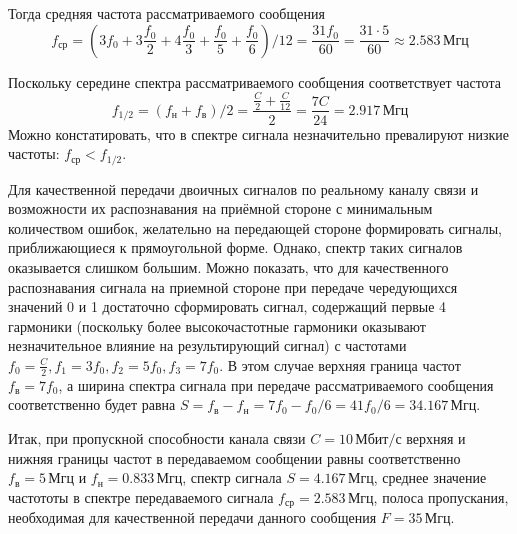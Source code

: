 Тогда средняя частота рассматриваемого сообщения
\[
	f_{\text{ср}} = \left(3f_0+3\frac{f_0}{2}+4\frac{f_0}{3}+\frac{f_0}{5}+\frac{f_0}{6}\right)/ 12 = \frac{31f_0}{60} = \frac{31 \cdot 5}{60} \approx 2.583 \, \text{Мгц}
\]

Поскольку середине спектра рассматриваемого сообщения соответствует частота
\[
	f_{1/2} = (f_{\text{н}} + f_{\text{в}}) /2 = \frac{\frac{C}{2} + \frac{C}{12}}{2} = \frac{7C}{24} = 2.917 \, \text{Мгц}
\]
Можно констатировать, что в спектре сигнала незначительно превалируют низкие частоты: $f_{\text{ср}} < f_{1/2}$.

Для качественной передачи двоичных сигналов по реальному каналу связи и возможности их распознавания на приёмной стороне с минимальным количеством ошибок, желательно на передающей стороне формировать сигналы, приближающиеся к прямоугольной форме. Однако, спектр таких сигналов оказывается слишком большим. Можно показать, что для качественного распознавания сигнала на приемной стороне при передаче чередующихся значений 0 и 1 достаточно сформировать сигнал, содержащий первые 4 гармоники (поскольку более высокочастотные гармоники оказывают незначительное влияние на результирующий сигнал) с частотами $f_0=\frac{C}{2}, f_1=3f_0, f_2=5f_0, f_3=7f_0$. В этом случае верхняя граница частот $f_{\text{в}}=7f_0$, а ширина спектра сигнала при передаче рассматриваемого сообщения соответственно будет равна $S = f_{\text{в}} - f_{\text{н}} = 7f_0-f_0/6=41f_0/6=34.167 \, \text{Мгц}$.

Итак, при пропускной способности канала связи $C = 10 \, \text{Мбит/с}$ верхняя и нижняя границы частот в передаваемом сообщении равны соответственно $f_{\text{в}} = 5 \, \text{Мгц}$ и $f_{\text{н}} = 0.833 \, \text{Мгц}$, спектр сигнала $S = 4.167 \, \text{Мгц}$, среднее значение частототы в спектре передаваемого сигнала $f_{\text{ср}} = 2.583 \, \text{Мгц}$, полоса пропускания, необходимая для качественной передачи данного сообщения $F=35 \, \text{Мгц}$.
